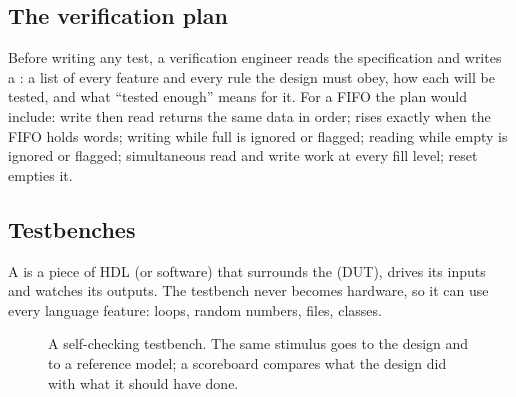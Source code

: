 \subsection*{The verification plan}

Before writing any test, a verification engineer reads the specification and writes a : a list of every feature and every rule the design must obey, how each will be tested, and what ``tested enough'' means for it. For a FIFO the plan would include: write then read returns the same data in order;  rises exactly when the FIFO holds  words; writing while full is ignored or flagged; reading while empty is ignored or flagged; simultaneous read and write work at every fill level; reset empties it.

\subsection*{Testbenches}

A  is a piece of HDL (or software) that surrounds the  (DUT), drives its inputs and watches its outputs. The testbench never becomes hardware, so it can use every language feature: loops, random numbers, files, classes.

\begin{figure}[h]
\centering
{}
\caption{A self-checking testbench. The same stimulus goes to the design and to a reference model; a scoreboard compares what the design did with what it should have done.}
\label{fig:testbench}
\end{figure}

